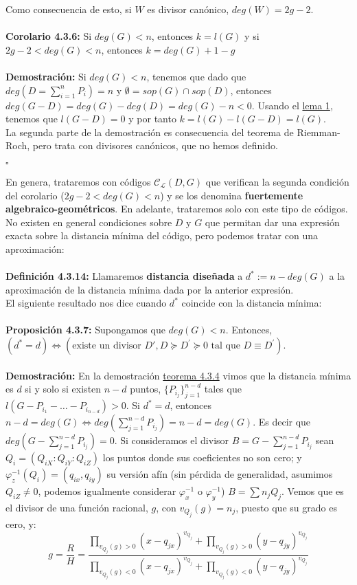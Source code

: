 \documentclass[11pt,spanish]{book}
\newcommand{\qed}{\begin{flushright} $\square$ \end{flushright}}
\begin{document}
Como consecuencia de esto, si $W$ es divisor canónico, $deg(W)=2g-2$.\\
\\ \hypertarget{fuertementeAG}{\textbf{Corolario 4.3.6: }} Si $deg(G)<n$, entonces $k=l(G)$ y si $2g-2<deg(G)<n$, entonces $k=deg(G)+1-g$\\
\\ \textbf{Demostración:}
Si $deg(G)<n$, tenemos que dado que $deg(D=\sum_{i=1}^{n}P_i)=n$ y $\emptyset=sop(G)\cap sop(D)$, entonces $deg(G-D)=deg(G)-deg(D)=deg(G)-n<0$. Usando el \hyperlink{lemaDivisores}{lema 1}, tenemos que $l(G-D)=0$ y por tanto $k=l(G)-l(G-D)=l(G)$.\\
La segunda parte de la demostración es consecuencia del teorema de Riemman-Roch, pero trata con divisores canónicos, que no hemos definido. 
\qed

En genera, trataremos con códigos $\mathcal{C}_{\mathcal{L}}(D,G)$ que verifican la segunda condición del corolario ($2g-2<deg(G)<n$) y se los denomina \textbf{fuertemente algebraico-geométricos}. En adelante, trataremos solo con este tipo de códigos.\\

No existen en general condiciones sobre $D$ y $G$ que permitan dar una expresión exacta sobre la distancia mínima del código, pero podemos tratar con una aproximación:\\
\\ \textbf{Definición 4.3.14: } Llamaremos \textbf{distancia diseñada} a $d^{*}:=n-deg(G)$ a la aproximación de la distancia mínima dada por la anterior expresión.\\

El siguiente resultado nos dice cuando $d^{*}$ coincide con la distancia mínima:\\
\\ \textbf{Proposición 4.3.7: } Supongamos que $deg(G)<n$. Entonces, $(d^{*}=d)\Longleftrightarrow (\text{existe un divisor }D', D\succeq D^{'}\succeq 0 \text{ tal que }D\equiv D^{'})$.\\
\\ \textbf{Demostración: }
En la demostración \hyperlink{teorema13.1.3}{teorema 4.3.4} vimos que la distancia mínima es $d$ si y solo si existen $n-d$ puntos, $\{P_{i_j}\}_{j=1}^{n-d}$ tales que $l(G-P_{i_1}-\dots-P_{i_{n-d}}) > 0$. Si $d^{*}=d$, entonces $n-d=deg(G)\Leftrightarrow deg(\sum_{j=1}^{n-d}P_{i_{j}})=n-d=deg(G)$. Es decir que $deg(G-\sum_{j=1}^{n-d}P_{i_{j}})=0$. Si consideramos el divisor $B=G-\sum_{j=1}^{n-d}P_{i_{j}}$  sean  $Q_{i}=(Q_{iX}:Q_{iY}:Q_{iZ})$ los puntos donde sus coeficientes no son cero; y $\varphi_{z}^{-1}(Q_{i})=(q_{ix},q_{iy})$ su versión afín (sin pérdida de generalidad, asumimos $Q_{iZ}\neq 0$, podemos igualmente considerar $\varphi_{x}^{-1}$ o $\varphi_{y}^{-1}$) $B=\sum n_j Q_{j}$. Vemos que es el divisor de una función racional, $g$, con $v_{Q_j}(g)=n_j$, puesto que su grado es cero, y:
$$g=\frac{R}{H}=\frac{\prod_{v_{Q_j}(g)>0}(x-q_{jx})^{v_{Q_j}}+\prod_{v_{Q_j}(g)>0}(y-q_{jy})^{v_{Q_j}}}{\prod_{v_{Q_j}(g)<0}(x-q_{jx})^{v_{Q_j}}+\prod_{v_{Q_j}(g)<0}(y-q_{jy})^{v_{Q_j}}}$$
\end{document}
